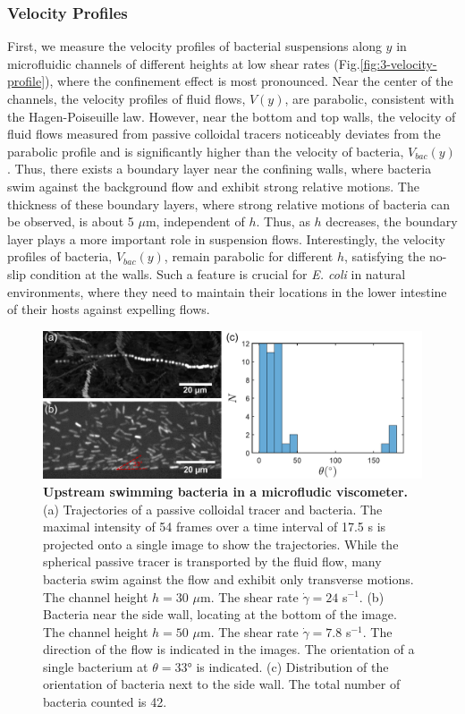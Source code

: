 \subsubsection{Velocity Profiles}
First, we measure the velocity profiles of bacterial suspensions along $y$ in microfluidic channels of different heights at low shear rates (Fig.\ref{fig:3-velocity-profile}), where the confinement effect is most pronounced. Near the center of the channels, the velocity profiles of fluid flows, $V(y)$, are parabolic, consistent with the Hagen-Poiseuille law. However, near the bottom and top walls, the velocity of fluid flows measured from passive colloidal tracers noticeably deviates from the parabolic profile and is significantly higher than the velocity of bacteria, $V_{bac}(y)$. Thus, there exists a boundary layer near the confining walls, where bacteria swim against the background flow and exhibit strong relative motions. The thickness of these boundary layers, where strong relative motions of bacteria can be observed, is about 5 $\mu$m, independent of $h$. Thus, as $h$ decreases, the boundary layer plays a more important role in suspension flows. Interestingly, the velocity profiles of bacteria, $V_{bac}(y)$, remain parabolic for different $h$, satisfying the no-slip condition at the walls. Such a feature is
crucial for \textit{E. coli} in natural environments, where they need to maintain their locations in the lower intestine of their hosts against expelling flows.

\begin{figure}[!ht]
	\begin{center}
	\includegraphics[width=5.5 in]{Figs/3-Rheo/4.pdf}
	\end{center}
	\caption[Upstream Swimming Bacteria in a Microfludic Viscometer]
	{
	\textbf{Upstream swimming bacteria in a microfludic viscometer.}
   (a) Trajectories of a passive colloidal tracer and bacteria. The maximal intensity of 54 frames over a time interval of 17.5 s is projected onto a single image to show the trajectories. While the spherical passive tracer is transported by the fluid flow, many bacteria swim against the flow and exhibit only transverse motions. The channel height $h = 30$ $\mu$m. The shear rate $\dot\gamma = 24$ s$^{-1}$.
   (b) Bacteria near the side wall, locating at the bottom of the image. The channel height $h = 50$ $\mu$m. The shear rate $\dot\gamma = 7.8$ s$^{-1}$. The direction of the flow is indicated in the images. The orientation of a single bacterium at $\theta = 33$° is indicated.
   (c) Distribution of the orientation of bacteria next to the side wall. The total number of bacteria counted is 42.
	}
	\label{fig:3-upstream}
\end{figure}

